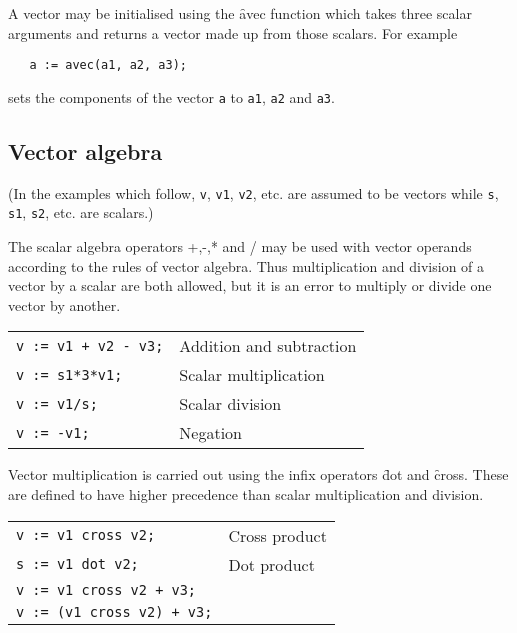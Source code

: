 \hypertarget{operator:VEC}{}
A vector may be initialised using the \f{avec} function which
takes three scalar arguments and returns a vector made up
from those scalars. For example
\begin{verbatim}
   a := avec(a1, a2, a3);
\end{verbatim}
sets the components of the vector \texttt{a} to \texttt{a1}, \texttt{a2} and \texttt{a3}.

\subsection{Vector algebra}

(In the examples which follow, \texttt{v}, \texttt{v1}, \texttt{v2}, etc.
are assumed to be vectors while \texttt{s}, \texttt{s1}, \texttt{s2}, etc. are scalars.)

The scalar algebra operators +,-,* and / may be used with
vector operands according to the rules of vector algebra.
Thus multiplication and division of a vector by a scalar
are both allowed, but it is an error to multiply or
divide one vector by another.

\begin{tabular}{l l}
\texttt{v := v1 + v2 - v3;} & Addition and subtraction \\
\texttt{v := s1*3*v1;} & Scalar multiplication \\
\texttt{v := v1/s;} & Scalar division \\
\texttt{v := -v1;} & Negation \\
\end{tabular}

  
\hypertarget{operator:DOT}{}
\hypertarget{operator:CROSS}{}
\noindent Vector multiplication is carried out using the infix
operators \f{dot} and \f{cross}. These are defined to have
higher precedence than scalar multiplication and
division.

\begin{tabular}{l l}
\texttt{v := v1 cross v2;} & Cross product \\
\texttt{s := v1 dot v2;} & Dot product \\
\texttt{v := v1 cross v2 + v3;} & \\
\texttt{v := (v1 cross v2) + v3;} & \\
\end{tabular}

